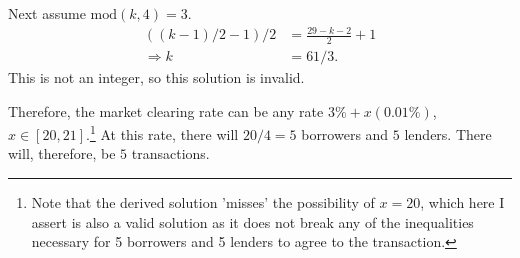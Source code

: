 \documentclass[11pt]{article} %
\begin{document}
Next assume $\text{mod}(k,4) = 3$.
\begin{align*}
((k-1)/2 -1)/2 &= \frac{29 - k - 2}{2} +1\\
\Rightarrow k &= 61/3.
\end{align*}
This is not an integer, so this solution is invalid.

Therefore, the market clearing rate can be any rate $3\%+x(0.01\%)$, $x \in [20,21]$.\footnote{Note that the derived solution 'misses' the possibility of $x=20$, which here I assert is also a valid solution as it does not break any of the inequalities necessary for 5 borrowers and 5 lenders to agree to the transaction.} At this rate, there will $20/4 = 5$ borrowers and $5$ lenders. There will, therefore, be $5$ transactions.
\end{document}
